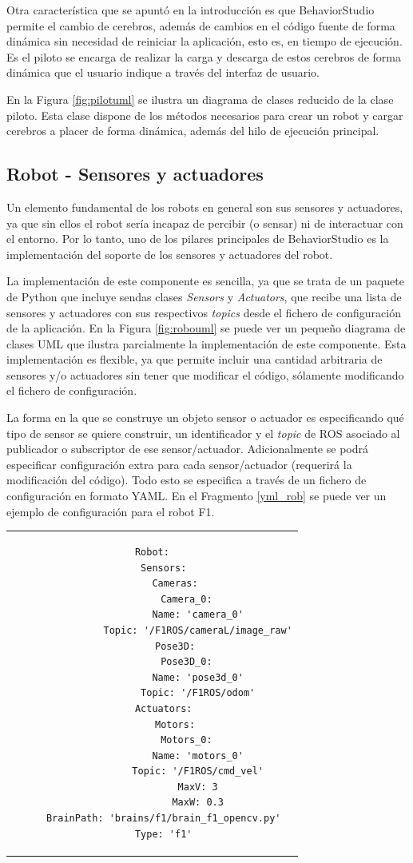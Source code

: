 Otra característica que se apuntó en la introducción es que BehaviorStudio permite el cambio de cerebros, además de cambios en el código fuente de forma dinámica sin necesidad de reiniciar la aplicación, esto es, en tiempo de ejecución. Es el piloto se encarga de realizar la carga y descarga de estos cerebros de forma dinámica que el usuario indique a través del interfaz de usuario.

En la Figura \ref{fig:pilotuml} se ilustra un diagrama de clases reducido de la clase piloto. Esta clase dispone de los métodos necesarios para crear un robot y cargar cerebros a placer de forma dinámica, además del hilo de ejecución principal.

\subsection{Robot - Sensores y actuadores}

Un elemento fundamental de los robots en general son sus sensores y actuadores, ya que sin ellos el robot sería incapaz de percibir (o sensar) ni de interactuar con el entorno. Por lo tanto, uno de los pilares principales de BehaviorStudio es la implementación del soporte de los sensores y actuadores del robot.

La implementación de este componente es sencilla, ya que se trata de un paquete de Python que incluye sendas clases \textit{Sensors} y \textit{Actuators}, que recibe una lista de sensores y actuadores con sus respectivos \textit{topics} desde el fichero de configuración de la aplicación. En la Figura \ref{fig:robouml} se puede ver un pequeño diagrama de clases UML que ilustra parcialmente la implementación de este componente. Esta implementación es flexible, ya que permite incluir una cantidad arbitraria de sensores y/o actuadores sin tener que modificar el código, sólamente modificando el fichero de configuración.

La forma en la que se construye un objeto sensor o actuador es especificando qué tipo de sensor se quiere construir, un identificador y el \textit{topic} de ROS asociado al publicador o subscriptor de ese sensor/actuador. Adicionalmente se podrá especificar configuración extra para cada sensor/actuador (requerirá la modificación del código). Todo esto se especifica a través de un fichero de configuración en formato YAML. En el Fragmento \ref{yml_rob} se puede ver un ejemplo de configuración para el robot F1.

\begin{tabular}{c}
\begin{lstlisting}[caption={Ejemplo de configuración en formato YAML},label=yml_rob]
Robot:
    Sensors:
        Cameras:
            Camera_0:
                Name: 'camera_0'
                Topic: '/F1ROS/cameraL/image_raw'
        Pose3D:
            Pose3D_0:
                Name: 'pose3d_0'
                Topic: '/F1ROS/odom'
    Actuators:
        Motors:
            Motors_0:
                Name: 'motors_0'
                Topic: '/F1ROS/cmd_vel'
                MaxV: 3
                MaxW: 0.3
    BrainPath: 'brains/f1/brain_f1_opencv.py'
    Type: 'f1'
\end{lstlisting}
\end{tabular}

